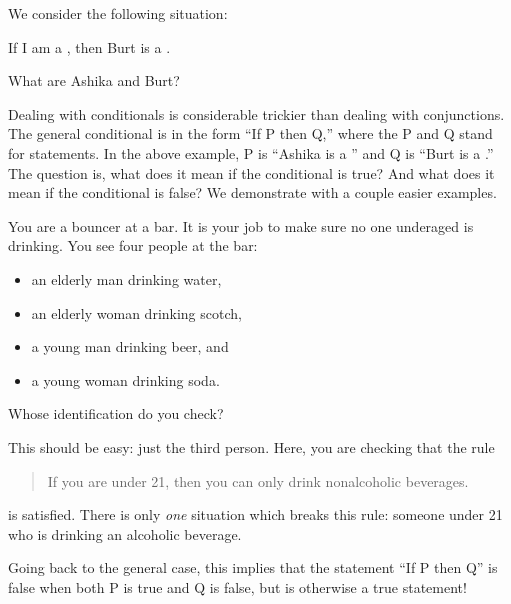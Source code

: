 \documentclass{tufte-book}
\begin{document}
We consider the following situation:
\begin{example}
  \begin{dialogue}
     If I am a \knight, then Burt is a \knave.
  \end{dialogue}
\end{example}
What are Ashika and Burt?

Dealing with conditionals is considerable trickier than dealing with conjunctions. The general conditional is in the form ``If P then Q,'' where the P and Q stand for statements. In the above example, P is ``Ashika is a \knight'' and Q is ``Burt is a \knave.'' The question is, what does it mean if the conditional is true? And what does it mean if the conditional is false? We demonstrate with a couple easier examples.

\begin{example}
  You are a bouncer at a bar. It is your job to make sure no one underaged is drinking. You see four people at the bar:
  \begin{itemize}
      \item an elderly man drinking water,
      \item an elderly woman drinking scotch,
      \item a young man drinking beer, and
      \item a young woman drinking soda.
  \end{itemize}
  Whose identification do you check?
\end{example}
This should be easy: just the third person. Here, you are checking that the rule
\begin{quote}
  If you are under 21, then you can only drink nonalcoholic beverages.
\end{quote}
is satisfied. There is only \emph{one} situation which breaks this rule: someone under 21 who is drinking an alcoholic beverage. 

Going back to the general case, this implies that the statement ``If P then Q'' is false when both P is true and Q is false, but is otherwise a true statement!
\end{document}
